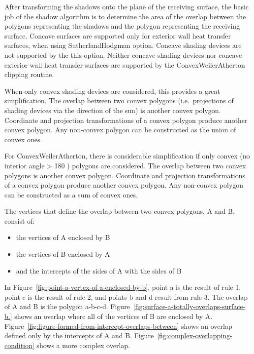 After transforming the shadows onto the plane of the receiving surface, the basic job of the shadow algorithm is to determine the area of the overlap between the polygons representing the shadows and the polygon representing the receiving surface. Concave surfaces are supported only for exterior wall heat transfer surfaces, when using SutherlandHodgman option. Concave shading devices are not supported by the this option. Neither concave shading devices nor concave exterior wall heat transfer surfaces are supported by the ConvexWeilerAtherton clipping routine.

When only convex shading devices are considered, this provides a great simplification. The overlap between two convex polygons (i.e.~projections of shading devices via the direction of the sun) is another convex polygon. Coordinate and projection transformations of a convex polygon produce another convex polygon. Any non-convex polygon can be constructed as the union of convex ones.

For ConvexWeilerAtherton, there is considerable simplification if only convex (no interior angle \textgreater{} 180 ) polygons are considered. The overlap between two convex polygons is another convex polygon. Coordinate and projection transformations of a convex polygon produce another convex polygon. Any non-convex polygon can be constructed as a sum of convex ones.

The vertices that define the overlap between two convex polygons, A and B, consist of:

\begin{itemize}
\item
  the vertices of A enclosed by B
\item
  the vertices of B enclosed by A
\item
  and the intercepts of the sides of A with the sides of B
\end{itemize}

In Figure~\ref{fig:point-a-vertex-of-a-enclosed-by-b}, point a is the result of rule 1, point c is the result of rule 2, and points b and d result from rule 3. The overlap of A and B is the polygon a-b-c-d. Figure~\ref{fig:surface-a-totally-overlaps-surface-b.} shows an overlap where all of the vertices of B are enclosed by A.~ Figure~\ref{fig:figure-formed-from-intercept-overlaps-between} shows an overlap defined only by the intercepts of A and B. Figure~\ref{fig:complex-overlapping-condition} shows a more complex overlap.

